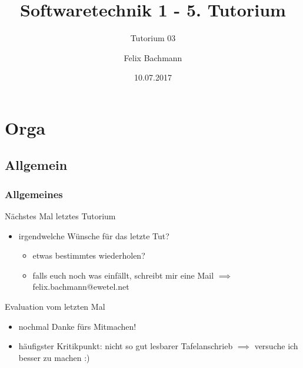 \documentclass[18pt]{beamer}
\title[SWT1]{Softwaretechnik 1 - 5. Tutorium}
\subtitle{Tutorium 03}
\author{Felix Bachmann}
\date{10.07.2017}
\institute{KIT - Institut für Programmstrukturen und Datenorganisation (IPD)}
\begin{document}
	
	
\begin{frame}
\titlepage
\end{frame}

\begin{frame}
\tableofcontents
\end{frame}


\section{Orga}

	\subsection{Allgemein}
	\begin{frame}
		\frametitle{Allgemeines}
		\begin{alertblock}{Nächstes Mal letztes Tutorium} 
		\begin{itemize}
			\item irgendwelche Wünsche für das letzte Tut?
			\begin{itemize}
				\item etwas bestimmtes wiederholen?
				\item falls euch noch was einfällt, schreibt mir eine Mail
				\linebreak $\implies$ felix.bachmann@ewetel.net
			\end{itemize}
		\end{itemize}
		\end{alertblock}
		\pause
		\begin{block}{Evaluation vom letzten Mal}
			\begin{itemize}
				\item nochmal Danke fürs Mitmachen! \pause
				\item häufigster Kritikpunkt: nicht so gut lesbarer Tafelanschrieb
				\linebreak $\implies$ versuche ich besser zu machen :)
			\end{itemize}
		\end{block}
	\end{frame}
\end{document}
